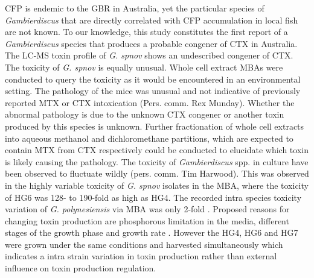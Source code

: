 \documentclass[12pt]{article}
\begin{document}
CFP is endemic to the GBR in Australia, yet the particular species of \textit{Gambierdiscus} that are directly correlated with CFP accumulation in local fish are not known. To our knowledge, this study constitutes the first report of a \textit{Gambierdiscus} species that produces a probable congener of CTX in Australia. The LC-MS toxin profile of \emph{G. spnov} shows an undescribed congener of CTX.
The toxicity of \emph{G. spnov} is equally unusual. Whole cell extract MBAs were conducted to query the toxicity as it would be encountered in an environmental setting. The pathology of the mice was unusual and not indicative of previously reported MTX or CTX intoxication (Pers. comm. Rex Munday). Whether the abnormal pathology is due to the unknown CTX congener or another toxin produced by this species is unknown. Further fractionation of whole cell extracts into aqueous methanol and dichloromethane partitions, which are expected to contain MTX from CTX respectively \citep{satake1993structure} could be conducted to elucidate which toxin is likely causing the pathology.
The toxicity of \emph{Gambierdiscus} spp. in culture have been observed to fluctuate wildly (pers. comm. Tim Harwood). This was observed in the highly variable toxicity of \emph{G. spnov} isolates in the MBA, where the toxicity of HG6 was 128- to 190-fold as high as HG4.  The recorded intra species toxicity variation of \emph{G. polynesiensis} via MBA was only 2-fold \citep{chinain2010growth}. Proposed reasons for changing toxin production are phosphorous limitation in the media, different stages of the growth phase and growth rate \citep{sperr1996variation,chinain2010growth}. However the HG4, HG6 and HG7 were grown under the same conditions and harvested simultaneously which indicates a intra strain variation in toxin production rather than external influence on toxin production regulation.\\



\end{document}
